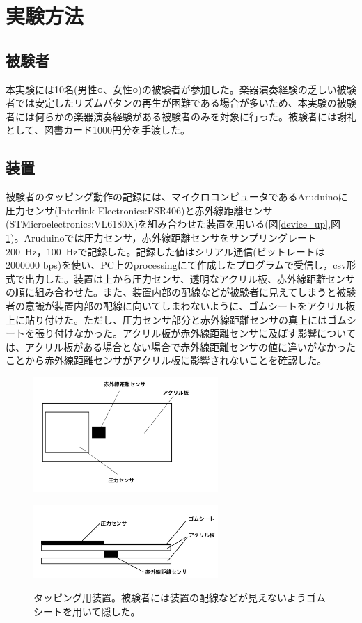 \documentclass[twocolumn,10pt]{jarticle}
\begin{document}
\section{実験方法}
\subsection{被験者}
本実験には10名(男性○、女性○)の被験者が参加した。楽器演奏経験の乏しい被験者では安定したリズムパタンの再生が困難である場合が多いため、本実験の被験者には何らかの楽器演奏経験がある被験者のみを対象に行った。被験者には謝礼として、図書カード1000円分を手渡した。

\subsection{装置}
被験者のタッピング動作の記録には、マイクロコンピュータであるAruduinoに圧力センサ(Interlink Electronics:FSR406)と赤外線距離センサ(STMicroelectronics:VL6180X)を組み合わせた装置を用いる(図\ref{device_up},図\ref{device_side})。Aruduinoでは圧力センサ，赤外線距離センサをサンプリングレート200\ Hz，100\ Hzで記録した。記録した値はシリアル通信(ビットレートは2000000 bps)を使い、PC上のprocessingにて作成したプログラムで受信し，csv形式で出力した。装置は上から圧力センサ、透明なアクリル板、赤外線距離センサの順に組み合わせた。また、装置内部の配線などが被験者に見えてしまうと被験者の意識が装置内部の配線に向いてしまわないように、ゴムシートをアクリル板上に貼り付けた。ただし、圧力センサ部分と赤外線距離センサの真上にはゴムシートを張り付けなかった。アクリル板が赤外線距離センサに及ぼす影響については、アクリル板がある場合とない場合で赤外線距離センサの値に違いがなかったことから赤外線距離センサがアクリル板に影響されないことを確認した。

\begin{figure}[htpb]
  \begin{minipage}{\hsize}
    \centering
    \includegraphics[width=7cm]{device_up.jpg}
    \label{device_up}
  \end{minipage}
  \begin{minipage}{\hsize}
    \centering
    \includegraphics[width=7cm]{device_side.jpg}
    \label{device_side}
  \end{minipage}
  \caption{タッピング用装置。被験者には装置の配線などが見えないようゴムシートを用いて隠した。}
\end{figure}
\end{document}
